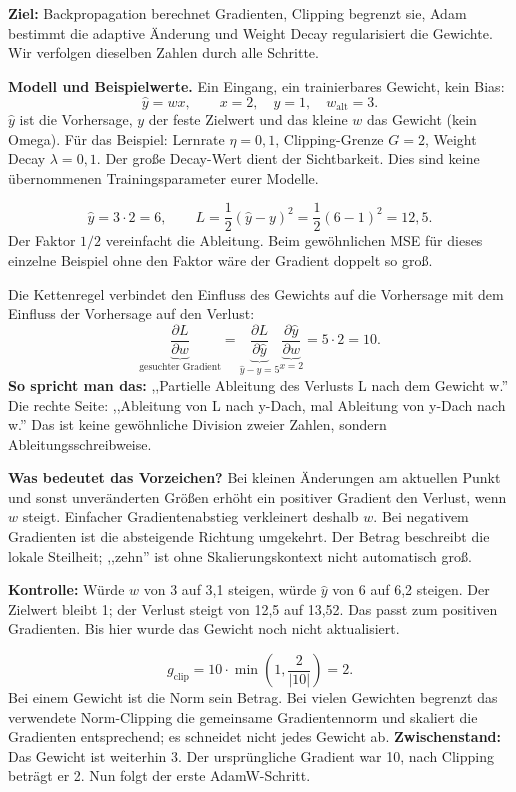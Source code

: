 \clearpage
{}
\textbf{Ziel:} Backpropagation berechnet Gradienten, Clipping begrenzt sie, Adam bestimmt die adaptive Änderung und Weight Decay regularisiert die Gewichte. Wir verfolgen dieselben Zahlen durch alle Schritte.

\textbf{Modell und Beispielwerte.} Ein Eingang, ein trainierbares Gewicht, kein Bias:
\[\boxed{\hat y=wx},\qquad x=2,\quad y=1,\quad w_{\mathrm{alt}}=3.\]
$\hat y$ ist die Vorhersage, $y$ der feste Zielwert und das kleine $w$ das Gewicht (kein Omega). Für das Beispiel: Lernrate $\eta=0{,}1$, Clipping-Grenze $G=2$, Weight Decay $\lambda=0{,}1$. Der große Decay-Wert dient der Sichtbarkeit. Dies sind keine übernommenen Trainingsparameter eurer Modelle.

\[\hat y=3\cdot2=6,\qquad L=\frac12(\hat y-y)^2=\frac12(6-1)^2=\boxed{12{,}5}.\]
Der Faktor $1/2$ vereinfacht die Ableitung. Beim gewöhnlichen MSE für dieses einzelne Beispiel ohne den Faktor wäre der Gradient doppelt so groß.

Die Kettenregel verbindet den Einfluss des Gewichts auf die Vorhersage mit dem Einfluss der Vorhersage auf den Verlust:
\[
\underbrace{\frac{\partial L}{\partial w}}_{\text{gesuchter Gradient}}
=
\underbrace{\frac{\partial L}{\partial\hat y}}_{\hat y-y=5}
\underbrace{\frac{\partial\hat y}{\partial w}}_{x=2}
=5\cdot2=\boxed{10}.
\]
\textbf{So spricht man das:} ,,Partielle Ableitung des Verlusts L nach dem Gewicht w.'' Die rechte Seite: ,,Ableitung von L nach y-Dach, mal Ableitung von y-Dach nach w.'' Das ist keine gewöhnliche Division zweier Zahlen, sondern Ableitungsschreibweise.

\textbf{Was bedeutet das Vorzeichen?} Bei kleinen Änderungen am aktuellen Punkt und sonst unveränderten Größen erhöht ein positiver Gradient den Verlust, wenn $w$ steigt. Einfacher Gradientenabstieg verkleinert deshalb $w$. Bei negativem Gradienten ist die absteigende Richtung umgekehrt. Der Betrag beschreibt die lokale Steilheit; ,,zehn'' ist ohne Skalierungskontext nicht automatisch groß.

\textbf{Kontrolle:} Würde $w$ von 3 auf 3,1 steigen, würde $\hat y$ von 6 auf 6,2 steigen. Der Zielwert bleibt 1; der Verlust steigt von 12,5 auf 13,52. Das passt zum positiven Gradienten. Bis hier wurde das Gewicht noch nicht aktualisiert.

\[g_{\mathrm{clip}}=10\cdot\min\left(1,\frac{2}{|10|}\right)=\boxed{2}.\]
Bei einem Gewicht ist die Norm sein Betrag. Bei vielen Gewichten begrenzt das verwendete Norm-Clipping die gemeinsame Gradientennorm und skaliert die Gradienten entsprechend; es schneidet nicht jedes Gewicht ab.
\clearpage
{}
\textbf{Zwischenstand:} Das Gewicht ist weiterhin 3. Der ursprüngliche Gradient war 10, nach Clipping beträgt er 2. Nun folgt der erste AdamW-Schritt.

